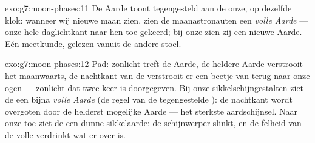 \begin{solution}{exo:g7:moon-phases:11}
De Aarde toont  tegengesteld aan de onze, op dezelfde
klok: wanneer wij nieuwe maan zien, zien de maanastronauten een
\emph{volle Aarde} --- onze hele daglichtkant naar hen toe gekeerd; bij
onze  zien zij een nieuwe Aarde. Eén meetkunde, gelezen
vanuit de andere stoel.
\end{solution}

\begin{solution}{exo:g7:moon-phases:12}
Pad: zonlicht treft de Aarde, de heldere Aarde verstrooit het
maanwaarts, de nachtkant van de  verstrooit er een beetje van
terug naar onze ogen --- zonlicht dat twee keer is doorgegeven. Bij
onze sikkelschijngestalten ziet de  een bijna
\emph{volle Aarde} (de regel van de tegengestelde ): de
nachtkant wordt overgoten door de helderst mogelijke Aarde --- het
sterkste aardschijnsel. Naar onze  toe ziet de
 een dunne sikkelaarde: de schijnwerper slinkt, en de
felheid van de volle  verdrinkt wat er over is.
\end{solution}


